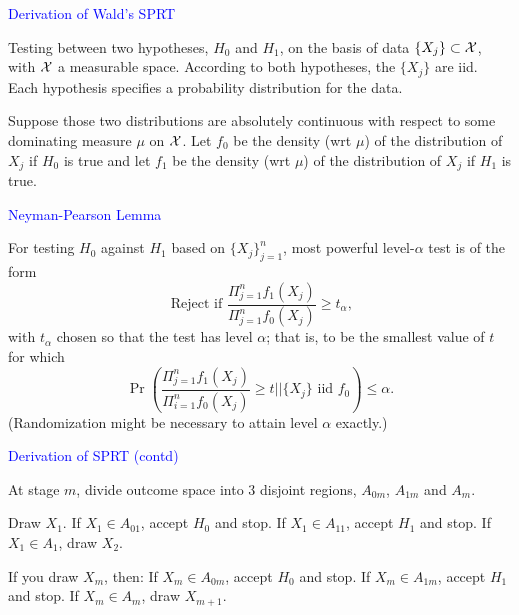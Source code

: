 \documentclass[landscape]{slides}
\newcommand{\cX}{{\cal X}}
\newcommand{\beq}{\begin{equation}}
\newcommand{\eeq}{\end{equation}}
\begin{document}
\begin{slide}
{\textcolor{blue}{Derivation of Wald's SPRT}}

Testing between two hypotheses, $H_0$ and $H_1$, on the basis of data
$\{X_j \} \subset \cX$, with $\cX$ a measurable space.
According to both hypotheses, the $\{X_j \}$ are iid.
Each hypothesis specifies a probability distribution for the data.

Suppose those two distributions are absolutely continuous with respect to
some dominating measure $\mu$ on $\cX$.
Let $f_0$ be the density (wrt $\mu$) of the distribution of $X_j$ if
$H_0$ is true and let 
$f_1$ be the density (wrt $\mu$) of the distribution of $X_j$ if
$H_1$ is true.

\end{slide}

\begin{slide}
{\textcolor{blue}{Neyman-Pearson Lemma}}

For testing $H_0$ against $H_1$ based on $\{X_j\}_{j=1}^n$,
most powerful level-$\alpha$ test is of the form
\beq
     {\mbox{ Reject if }} \frac{\Pi_{j=1}^n f_1(X_j)}{\Pi_{j=1}^n f_0(X_j)} \ge t_\alpha,
\eeq
with $t_\alpha$ chosen so that the test has level $\alpha$; that is, to be
the smallest value of $t$ for which
\beq
     \Pr \left ( \frac{\Pi_{j=1}^n f_1(X_j)}{\Pi_{i=1}^n f_0(X_j)} \ge t || \{X_j\} {\mbox{ iid }} f_0 \right )
         \le \alpha.
\eeq
(Randomization might be necessary to attain level $\alpha$ exactly.)

\end{slide}

\begin{slide}
{\textcolor{blue}{Derivation of SPRT (contd)}}

At stage $m$, divide outcome space into 3 disjoint regions,
$A_{0m}$, $A_{1m}$ and $A_m$.  

Draw $X_1$.
If $X_1 \in A_{01}$, accept $H_0$ and stop.
If $X_1 \in A_{11}$, accept $H_1$ and stop.
If $X_1 \in A_{1}$, draw $X_2$.

If you draw $X_m$, then:
If $X_m \in A_{0m}$, accept $H_0$ and stop.
If $X_m \in A_{1m}$, accept $H_1$ and stop.
If $X_m \in A_{m}$, draw $X_{m+1}$.

\end{slide}
\end{document}
